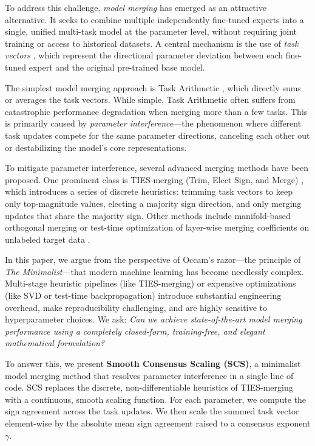 \documentclass{article}
\theoremstyle{plain}
\theoremstyle{definition}
\theoremstyle{remark}
\begin{document}
To address this challenge, \emph{model merging} has emerged as an attractive alternative. It seeks to combine multiple independently fine-tuned experts into a single, unified multi-task model at the parameter level, without requiring joint training or access to historical datasets. A central mechanism is the use of \emph{task vectors} \cite{Ilharco2022}, which represent the directional parameter deviation between each fine-tuned expert and the original pre-trained base model.

The simplest model merging approach is Task Arithmetic \cite{Ilharco2022}, which directly sums or averages the task vectors. While simple, Task Arithmetic often suffers from catastrophic performance degradation when merging more than a few tasks. This is primarily caused by \emph{parameter interference}—the phenomenon where different task updates compete for the same parameter directions, canceling each other out or destabilizing the model's core representations.

To mitigate parameter interference, several advanced merging methods have been proposed. One prominent class is TIES-merging (Trim, Elect Sign, and Merge) \cite{Yadav2024}, which introduces a series of discrete heuristics: trimming task vectors to keep only top-magnitude values, electing a majority sign direction, and only merging updates that share the majority sign. Other methods include manifold-based orthogonal merging \cite{OrthoMerge} or test-time optimization of layer-wise merging coefficients on unlabeled target data \cite{Yang2024b, SyMerge}.

In this paper, we argue from the perspective of Occam's razor—the principle of \emph{The Minimalist}—that modern machine learning has become needlessly complex. Multi-stage heuristic pipelines (like TIES-merging) or expensive optimizations (like SVD or test-time backpropagation) introduce substantial engineering overhead, make reproducibility challenging, and are highly sensitive to hyperparameter choices. We ask: \emph{Can we achieve state-of-the-art model merging performance using a completely closed-form, training-free, and elegant mathematical formulation?}

To answer this, we present \textbf{Smooth Consensus Scaling (SCS)}, a minimalist model merging method that resolves parameter interference in a single line of code. SCS replaces the discrete, non-differentiable heuristics of TIES-merging with a continuous, smooth scaling function. For each parameter, we compute the sign agreement across the task updates. We then scale the summed task vector element-wise by the absolute mean sign agreement raised to a consensus exponent $\gamma$.
\end{document}
